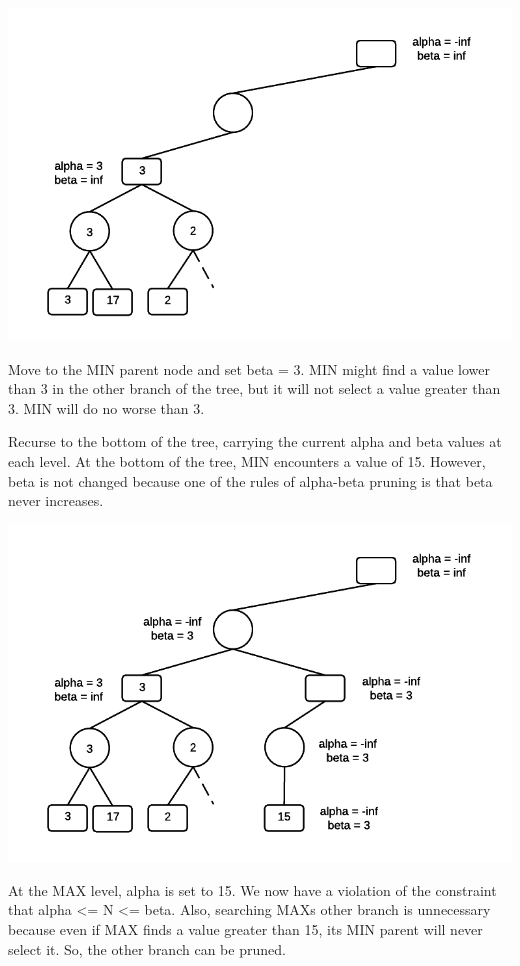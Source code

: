 \documentclass[11pt]{article}
\makeatletter
\def\maxwidth{\ifdim\Gin@nat@width>\linewidth\linewidth
    \else\Gin@nat@width\fi}
\let\Oldincludegraphics\includegraphics
\renewcommand{\includegraphics}[1]{\Oldincludegraphics[width=.8\maxwidth]{#1}}
\makeatother
\begin{document}
\includegraphics{img/ABExample5.png}

Move to the MIN parent node and set beta = 3. MIN might find a value
lower than 3 in the other branch of the tree, but it will not select a
value greater than 3. MIN will do no worse than 3.

Recurse to the bottom of the tree, carrying the current alpha and beta
values at each level. At the bottom of the tree, MIN encounters a value
of 15. However, beta is not changed because one of the rules of
alpha-beta pruning is that beta never increases.

\includegraphics{img/ABExample6.png}

At the MAX level, alpha is set to 15. We now have a violation of the
constraint that alpha \textless{}= N \textless{}= beta. Also, searching
MAXs other branch is unnecessary because even if MAX finds a value
greater than 15, its MIN parent will never select it. So, the other
branch can be pruned.
\end{document}
